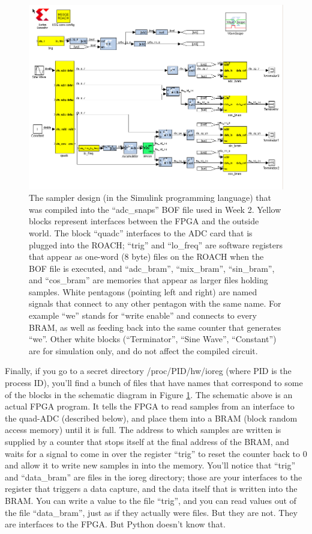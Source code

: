\documentclass[11pt]{article}
\begin{document}
\begin{figure}\centering
\includegraphics[width=6in]{plots/adc_snaps.png}
\caption{
The sampler design (in the Simulink programming language) that was compiled into the 
``adc\_snaps'' BOF file used in Week 2.  Yellow blocks represent interfaces between
the FPGA and the outside world.  The block ``quadc'' interfaces to the ADC card that
is plugged into the ROACH;  ``trig'' and ``lo\_freq'' are software registers that
appear as one-word (8 byte) files on the ROACH when the BOF file is executed, and
``adc\_bram'', ``mix\_bram'', ``sin\_bram'', and ``cos\_bram'' are memories that
appear as larger files holding samples.  White pentagons (pointing left and right) are
named signals that connect to any other pentagon with the same name.  For example
``we'' stands for ``write enable'' and connects to every BRAM, as well as feeding
back into the same counter that generates ``we''.  Other white blocks (``Terminator'',
``Sine Wave'', ``Constant'') are for simulation only, and do not affect the compiled circuit.
} \label{fig:adc_snaps}
\end{figure}

Finally, if you go to a secret directory /proc/PID/hw/ioreg (where PID is the process ID), you'll find
a bunch of files that have names that correspond to some of the blocks in the schematic diagram in Figure \ref{fig:adc_snaps}.
The schematic above is an actual FPGA program.  It tells the FPGA to read samples from an interface to
the quad-ADC (described below), and place them into a BRAM (block random access memory) until it is full.
The address to which samples are written is supplied by a counter that stops itself at the final address
of the BRAM, and waits for a signal to come in over the register ``trig'' to reset the counter back to
0 and allow it to write new samples in into the memory.  You'll notice that ``trig'' and ``data\_bram''
are files in the ioreg directory; those are your interfaces to the register that triggers a data capture,
and the data itself that is written into the BRAM.  You can write a value to the file ``trig'', and you can
read values out of the file ``data\_bram'', just as if they actually were files.  But they are not.  They
are interfaces to the FPGA.  But Python doesn't know that.
\end{document}
